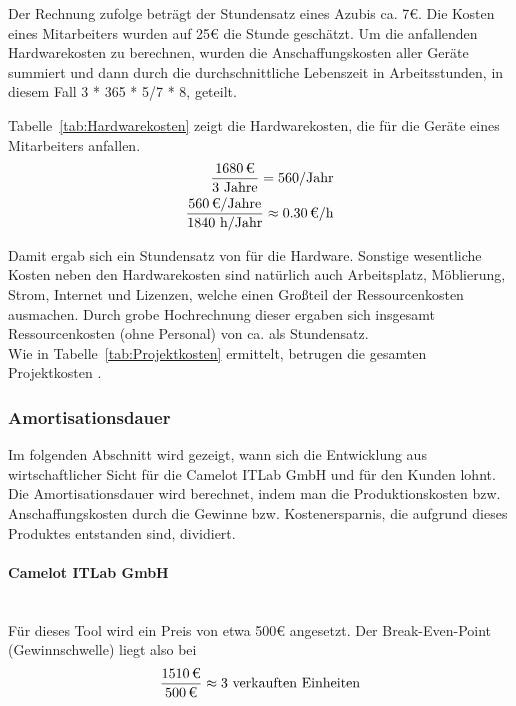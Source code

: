 Der Rechnung zufolge beträgt der Stundensatz eines Azubis ca. 7€. Die Kosten eines Mitarbeiters wurden auf 25€ die Stunde geschätzt. 
\newline
Um die anfallenden Hardwarekosten zu berechnen, wurden die Anschaffungskosten aller Geräte summiert und dann durch die durchschnittliche Lebenszeit in Arbeitsstunden, in diesem Fall 3 * 365 * 5/7 * 8, geteilt.
	
Tabelle~\ref{tab:Hardwarekosten} zeigt die Hardwarekosten, die für die Geräte eines Mitarbeiters anfallen.
\\

\begin{eqnarray}
	\frac{\eur{1680}}{3\mbox{ Jahre}} = 560 \mbox{/Jahr}\\
	\frac{\eur{560} \mbox{/Jahre}}{1840 \mbox{ h/Jahr}} \approx \eur{0.30}\mbox{/h}
\end{eqnarray}

Damit ergab sich ein Stundensatz von  für die Hardware.
\newline
Sonstige wesentliche Kosten neben den Hardwarekosten sind natürlich auch Arbeitsplatz, Möblierung, Strom, Internet und Lizenzen, welche einen Großteil der Ressourcenkosten ausmachen. Durch grobe Hochrechnung dieser ergaben sich insgesamt Ressourcenkosten (ohne Personal) von ca.  als Stundensatz.
\\
Wie in Tabelle~\ref{tab:Projektkosten} ermittelt, betrugen die gesamten Projektkosten .

\subsubsection{Amortisationsdauer}
\label{sec:Amortisationsdauer}
Im folgenden Abschnitt wird gezeigt, wann sich die Entwicklung aus wirtschaftlicher Sicht für die Camelot ITLab GmbH und für den Kunden lohnt. Die Amortisationsdauer wird berechnet, indem man die Produktionskosten bzw. Anschaffungskosten durch die Gewinne bzw. Kostenersparnis, die aufgrund dieses Produktes entstanden sind, dividiert.

\paragraph{Camelot ITLab GmbH}\mbox{} \\
Für dieses Tool wird ein Preis von etwa 500€ angesetzt. Der Break-Even-Point (Gewinnschwelle) liegt also bei
\begin{eqnarray}
\frac{\eur{1510}}{\eur{500}} \approx 3 \mbox{ verkauften Einheiten} 
\end{eqnarray}

